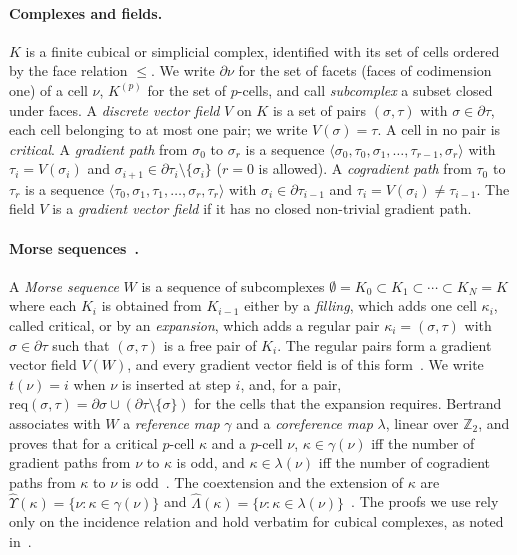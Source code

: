 \documentclass[runningheads]{llncs}
\newcommand{\req}{\mathrm{req}}
\newcommand{\coext}{\widehat{\Upsilon}}
\newcommand{\ext}{\widehat{\Lambda}}
\begin{document}
\paragraph{Complexes and fields.}
$K$ is a finite cubical or simplicial complex, identified with its set of
cells ordered by the face relation $\le$. We write $\partial\nu$ for the
set of facets (faces of codimension one) of a cell $\nu$, $K^{(p)}$ for the
set of $p$-cells, and call \emph{subcomplex} a subset closed under faces.
A \emph{discrete vector field} $V$ on $K$ is a set of pairs $(\sigma,\tau)$
with $\sigma\in\partial\tau$, each cell belonging to at most one pair; we
write $V(\sigma)=\tau$. A cell in no pair is \emph{critical}. A
\emph{gradient path} from $\sigma_0$ to $\sigma_r$ is a sequence
$\langle\sigma_0,\tau_0,\sigma_1,\ldots,\tau_{r-1},\sigma_r\rangle$ with
$\tau_i=V(\sigma_i)$ and $\sigma_{i+1}\in\partial\tau_i\setminus\{\sigma_i\}$
($r=0$ is allowed). A \emph{cogradient path} from $\tau_0$ to $\tau_r$ is a
sequence $\langle\tau_0,\sigma_1,\tau_1,\ldots,\sigma_r,\tau_r\rangle$ with
$\sigma_i\in\partial\tau_{i-1}$ and $\tau_i=V(\sigma_i)\ne\tau_{i-1}$. The
field $V$ is a \emph{gradient vector field} if it has no closed non-trivial
gradient path.

\paragraph{Morse sequences~\cite{Ber25a}.}
A \emph{Morse sequence} $W$ is a sequence of subcomplexes
$\emptyset=K_0\subset K_1\subset\cdots\subset K_N=K$ where each
$K_i$ is obtained from $K_{i-1}$ either by a \emph{filling}, which adds one
cell $\kappa_i$, called critical, or by an \emph{expansion}, which adds a
regular pair $\kappa_i=(\sigma,\tau)$ with $\sigma\in\partial\tau$ such that
$(\sigma,\tau)$ is a free pair of $K_i$. The regular pairs form a gradient
vector field $V(W)$, and every gradient vector field is of this
form~\cite[Th.~51]{Ber25a}. We write $t(\nu)=i$ when $\nu$ is inserted at
step $i$, and, for a pair,
$\req(\sigma,\tau)=\partial\sigma\cup(\partial\tau\setminus\{\sigma\})$ for
the cells that the expansion requires. Bertrand associates with $W$ a
\emph{reference map} $\gamma$ and a \emph{coreference map} $\lambda$, linear
over $\mathbb{Z}_2$, and proves that for a critical $p$-cell $\kappa$ and a
$p$-cell $\nu$, $\kappa\in\gamma(\nu)$ iff the number of gradient paths from
$\nu$ to $\kappa$ is odd, and $\kappa\in\lambda(\nu)$ iff the number of
cogradient paths from $\kappa$ to $\nu$ is odd~\cite[Th.~12]{Ber25a}. The
coextension and the extension of $\kappa$ are
$\coext(\kappa)=\{\nu:\kappa\in\gamma(\nu)\}$ and
$\ext(\kappa)=\{\nu:\kappa\in\lambda(\nu)\}$~\cite[Def.~32]{Ber25a}. The
proofs we use rely only on the incidence relation and hold verbatim for
cubical complexes, as noted in~\cite{BN25}.
\end{document}

